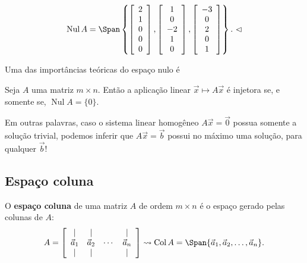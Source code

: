 \begin{ex}
\begin{equation}
	\operatorname{Nul} A =
	\Span \left\{
	\left[
	\begin{array}{c}
	2 \\
	1 \\
	0 \\
	0 \\
	0 \\
	\end{array}
	\right],
	\left[
	\begin{array}{c}
	1 \\
	0 \\
	-2 \\
	1 \\
	0 \\
	\end{array}
	\right],
	\left[
	\begin{array}{c}
	-3 \\
	0 \\
	2 \\
	0 \\
	1 \\
	\end{array}
	\right]\right\}. \ \lhd
	\end{equation}
\end{ex}

Uma das importâncias teóricas do espaço nulo é

\begin{prop}
	Seja $A$ uma matriz $m\times n$. Então a aplicação linear $\vec{x} \mapsto A \vec{x}$ é injetora se, e somente se, $\operatorname{Nul} A = \{ 0 \}.$
\end{prop}

Em outras palavras, caso o sistema linear homogêneo $A \vec{x} = \vec{0}$ possua somente a solução trivial, podemos inferir que $A \vec{x} = \vec{b}$ possui no máximo uma solução, para qualquer $\vec{b}$!

\subsection{Espaço coluna}


O \textbf{espaço coluna} de uma matriz $A$ de ordem $m \times n$ é o espaço gerado pelas colunas de $A$:
\begin{equation}
A =
\left[
\begin{array}{cccc}
| & | &  & | \\
\vec{a}_1 & \vec{a}_2 & \cdots & \vec{a}_n \\
| & | &        & | \\
\end{array}
\right] \rightsquigarrow
\operatorname{Col} A = \Span \{ \vec{a}_1, \vec{a}_2, \dots, \vec{a}_n\}.
\end{equation}

